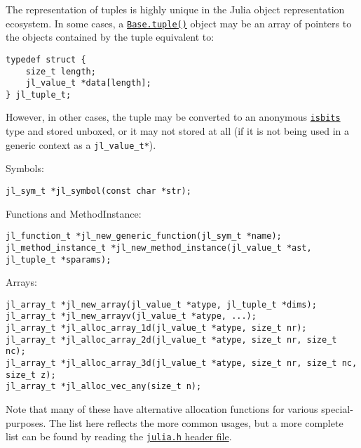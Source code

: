The representation of tuples is highly unique in the Julia object representation ecosystem. In some cases, a \hyperlink{12342862450082530092}{\texttt{Base.tuple()}} object may be an array of pointers to the objects contained by the tuple equivalent to:




\begin{lstlisting}
typedef struct {
    size_t length;
    jl_value_t *data[length];
} jl_tuple_t;
\end{lstlisting}



However, in other cases, the tuple may be converted to an anonymous \hyperlink{12980593021531333073}{\texttt{isbits}} type and stored unboxed, or it may not stored at all (if it is not being used in a generic context as a \texttt{jl\_value\_t*}).



Symbols:




\begin{lstlisting}
jl_sym_t *jl_symbol(const char *str);
\end{lstlisting}



Functions and MethodInstance:




\begin{lstlisting}
jl_function_t *jl_new_generic_function(jl_sym_t *name);
jl_method_instance_t *jl_new_method_instance(jl_value_t *ast, jl_tuple_t *sparams);
\end{lstlisting}



Arrays:




\begin{lstlisting}
jl_array_t *jl_new_array(jl_value_t *atype, jl_tuple_t *dims);
jl_array_t *jl_new_arrayv(jl_value_t *atype, ...);
jl_array_t *jl_alloc_array_1d(jl_value_t *atype, size_t nr);
jl_array_t *jl_alloc_array_2d(jl_value_t *atype, size_t nr, size_t nc);
jl_array_t *jl_alloc_array_3d(jl_value_t *atype, size_t nr, size_t nc, size_t z);
jl_array_t *jl_alloc_vec_any(size_t n);
\end{lstlisting}



Note that many of these have alternative allocation functions for various special-purposes. The list here reflects the more common usages, but a more complete list can be found by reading the \href{https://github.com/JuliaLang/julia/blob/master/src/julia.h}{\texttt{julia.h} header file}.



